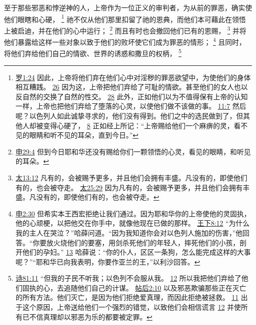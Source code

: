 \documentclass[12pt, a4paper, oneside]{ctexart}
\newcounter{parnum}[section]
\newcommand{\N}{%
   \noindent\refstepcounter{parnum}%
    \makebox[\parindent][l]{\textbf{\arabic{parnum}.}}}
\begin{document}
\N 至于那些邪恶和悖逆神的人，上帝作为一位正义的审判者，为从前的罪恶，确实使他们眼瞎和心硬，
	\footnote {
		\href{https://biblehub.com/romans/1-24.htm}{罗1:24} 因此，上帝将他们弃在他们心中对淫秽的罪恶欲望中，为使他们的身体相互糟践。
		\href{https://biblehub.com/romans/1-26.htm}{26} 因为这，上帝把他们弃给了可耻的情欲。甚至他们的女人也以反自然的交换了自然的性交。
		\href{https://biblehub.com/romans/1-28.htm}{28} 此外，正如他们以为不值得保有上帝的认知一样，上帝也把他们弃给了堕落的心灵，以使他们做不该做的事。
		\href{https://biblehub.com/romans/11-7.htm}{11:7} 然后呢？以色列人如此诚挚寻求的，他们没有得到。他们之中的选民做到了，但其他人却被变得心硬了，
		\href{https://biblehub.com/romans/11-8.htm}{8} 正如经上所记：“上帝赐给他们一个麻痹的灵，看不见的眼睛和听不见的耳朵，直到今日。”
	}
	祂不仅从他们那里扣留了祂的恩典，而他们本可藉此在领悟上被启迪，并在他们的心中运行；
	\footnote {
		\href{https://biblehub.com/deuteronomy/29-4.htm}{申29:4} 但到今日耶和华还没有赐给你们一颗领悟的心灵，看见的眼睛，和听见的耳朵。
	}
	而且有时也会撤回他们已有的恩赐，
	\footnote {
		\href{https://biblehub.com/matthew/13-12.htm}{太13:12} 凡有的，会被赐予更多，并且他们会拥有丰盛。凡没有的，即使他们有的，也会被夺走。
		\href{https://biblehub.com/matthew/25-29.htm}{太25:29} 因为凡有的，会被赐予更多，并且他们会拥有丰盛。凡没有的，即使他们有的，也会被夺走。
	}
	并将他们暴露给这样一些对象以致于他们的败坏使它们成为罪恶的情形；
	\footnote {
		\href{https://biblehub.com/deuteronomy/2-30.htm}{申2:30} 但希实本王西宏拒绝让我们通过。因为耶和华你的上帝使他的灵固执，他的心顽梗，以把他交在你手中，就像他现在已做的那样。
		\href{https://biblehub.com/2_kings/8-12.htm}{王下8:12} “为什么我的主人在哭泣？”哈薛问道。“因为我知道你会对以色列人施加的伤害，”他回答。“你要放火烧他们的要塞，用剑杀死他们的年轻人，摔死他们的小孩，剖开他们的孕妇。”
		\href{https://biblehub.com/2_kings/8-13.htm}{13} 哈薛说：“你的仆人，区区一条狗，怎么能完成这样的大事呢？”“耶和华已向我表明，你要作亚兰的王，”以利沙回答。
	}
	且同时，将他们弃给他们自己的情欲、世界的诱惑和撒旦的权柄，
	\footnote {
		\href{https://biblehub.com/psalms/81-11.htm}{诗81:11} “但我的子民不听我；以色列不会服从我。
		\href{https://biblehub.com/psalms/81-12.htm}{12} 所以我把他们弃给了他们固执的心，去追随他们自己的计谋。
		\href{https://biblehub.com/2_thessalonians/2-10.htm}{帖后2:10} 以及邪恶欺骗那些正在灭亡的所有方法。他们灭亡，是因为他们拒绝爱真理，而因此拒绝被拯救。
		\href{https://biblehub.com/2_thessalonians/2-11.htm}{11} 出于这个原因，上帝送给他们一个强烈的错觉，以致他们会相信谎言
		\href{https://biblehub.com/2_thessalonians/2-12.htm}{12} 并使所有已不信真理却以邪恶为乐的都要被定罪。
	}
\end{document}
